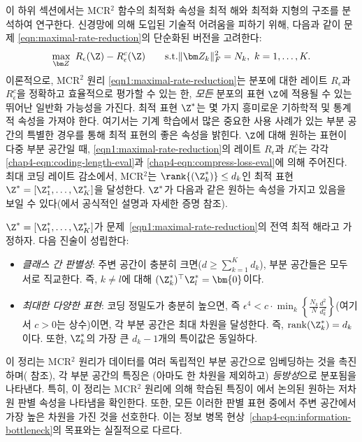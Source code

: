 \documentclass[../../book-main_ko.tex]{subfiles}
\begin{document}
이 하위 섹션에서는 MCR$^2$ 함수의 최적화 속성을 최적 해와 최적화 지형의 구조를 분석하여 연구한다. 신경망에 의해 도입된 기술적 어려움을 피하기 위해, 다음과 같이 문제 \eqref{eqn:maximal-rate-reduction}의 단순화된 버전을 고려한다: 
\begin{align}\label{eqn1:maximal-rate-reduction}
    \max_{\bm Z}\ R_{\epsilon}(\Z) - R_{\epsilon}^c(\Z)\qquad \mathrm{s.t.}     \|\bm Z_k\|_F^2 = N_k,\ k =1,\dots,K. 
\end{align}
이론적으로, MCR$^2$ 원리 \eqref{eqn1:maximal-rate-reduction}는 분포에 대한 레이트 $R_\epsilon$과 $R^c_\epsilon$을 정확하고 효율적으로 평가할 수 있는 한, {\em 모든} 분포의 표현 $\Z$에 적용될 수 있는 뛰어난 일반화 가능성을 가진다. 최적 표현 $\Z^{\ast}$는 몇 가지 흥미로운 기하학적 및 통계적 속성을 가져야 한다. 여기서는 기계 학습에서 많은 중요한 사용 사례가 있는 부분 공간의 특별한 경우를 통해 최적 표현의 좋은 속성을 밝힌다. $\Z$에 대해 원하는 표현이 다중 부분 공간일 때, \eqref{eqn1:maximal-rate-reduction}의 레이트 $R_\epsilon$과 $R^c_\epsilon$는 각각 \eqref{chap4-eqn:coding-length-eval}과 \eqref{chap4-eqn:compress-loss-eval}에 의해 주어진다. 최대 코딩 레이트 감소에서, MCR$^2$는 $\rank{(\Z_{k}^*)}\le d_k$인 최적 표현 $\Z^{\ast} = [\Z_1^*,\dots,\Z_K^*]$을 달성한다. $\Z^{\ast}$가 다음과 같은 원하는 속성을 가지고 있음을 보일 수 있다(\cite{yu2020learning}에서 공식적인 설명과 자세한 증명 참조).

\begin{theorem}[\bf 전역 최적 해의 특성화]
    $\Z^{\ast} = [\Z_1^*,\dots,\Z_K^*]$가 문제~\eqref{eqn1:maximal-rate-reduction}의 전역 최적 해라고 가정하자. 다음 진술이 성립한다:
    \begin{itemize}
        \item {\em 클래스 간 판별성}: 주변 공간이 충분히 크면($d \ge \sum_{k=1}^{K} d_k$), 부분 공간들은 모두 서로 직교한다. 즉, $k \not= l$에 대해 $(\Z_{k}^*)^{\top} \Z_{l}^* = \bm{0}$이다.
        \item {\em 최대한 다양한 표현}:
                코딩 정밀도가 충분히 높으면, 즉 $\epsilon ^4 < c\cdot \min_{k}\left\{ \frac{N_k}{N}\frac{d^2}{d_k^2}\right\}$(여기서 $c>0$는 상수)이면, 각 부분 공간은 최대 차원을 달성한다. 즉, $\mathrm{rank}{(\Z_{k}^*)}= d_k$이다. 또한, $\Z_{k}^*$의 가장 큰 $d_k-1$개의 특이값은 동일하다.
            \label{thm:MCR2-properties}
    \end{itemize}
\end{theorem}


이 정리는 MCR$^2$ 원리가 데이터를 여러 독립적인 부분 공간으로 임베딩하는 것을 촉진하며( 참조), 각 부분 공간의 특징은 (아마도 한 차원을 제외하고) {\em 등방성}으로 분포됨을 나타낸다. 특히, 이 정리는 MCR$^2$ 원리에 의해 학습된 특징이 에서 논의된 원하는 저차원 판별 속성을 나타냄을 확인한다. 또한, 모든 이러한 판별 표현 중에서 주변 공간에서 가장 높은 차원을 가진 것을 선호한다. 이는 정보 병목 현상~\eqref{chap4-eqn:information-bottleneck}의 목표와는 실질적으로 다르다.
\end{document}

